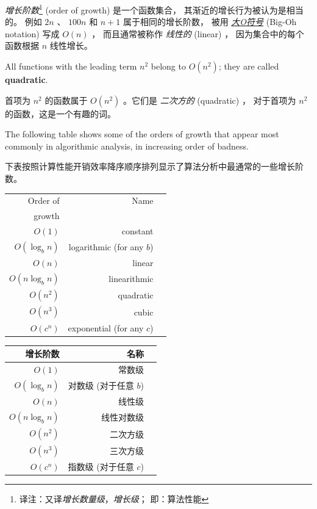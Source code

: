 {\em 增长阶数}\footnote{译注：又译{\em 增长数量级}，{\em 增长级}； 即：算法性能} (order of growth) 是一个函数集合， 其渐近的增长行为被认为是相当的。
例如 $2n$ 、 $100n$ 和 $n+1$ 属于相同的增长阶数，
被用 \href{https://zh.wikipedia.org/wiki/%E5%A4%A7O%E7%AC%A6%E5%8F%B7}{{\em 大{\em O}符号}} (Big-Oh notation) 写成 $O(n)$ ，
而且通常被称作 {\em 线性的} (linear) ，
因为集合中的每个函数根据 $n$ 线性增长。
  

All functions with the leading term $n^2$ belong to $O(n^2)$; they are
called {\bf quadratic}.

首项为 $n^2$ 的函数属于 $O(n^2)$ 。它们是 {\em 二次方的} (quadratic) ，
对于首项为 $n^2$ 的函数，这是一个有趣的词。

The following table shows some of the orders of growth that
appear most commonly in algorithmic analysis,
in increasing order of badness.

下表按照计算性能开销效率降序顺序排列显示了算法分析中最通常的一些增长阶数。

\begin{tabular}{|r|r|r|}
\hline
Order of     &   Name      \\
growth       &               \\
\hline
$O(1)$             & constant \\
$O(\log_b n)$      & logarithmic (for any $b$) \\
$O(n)$             & linear \\
$O(n \log_b n)$    & linearithmic \\
$O(n^2)$           & quadratic     \\
$O(n^3)$           & cubic     \\
$O(c^n)$           & exponential (for any $c$)    \\
\hline
\end{tabular}

\begin{tabular}{|r|r|r|}
\hline
增长阶数     &   名称      \\
\hline
$O(1)$             & 常数级 \\
$O(\log_b n)$      & 对数级 (对于任意 $b$) \\
$O(n)$             & 线性级 \\
$O(n \log_b n)$    & 线性对数级 \\
$O(n^2)$           & 二次方级     \\
$O(n^3)$           & 三次方级     \\
$O(c^n)$           & 指数级 (对于任意 $c$)    \\
\hline
\end{tabular}

